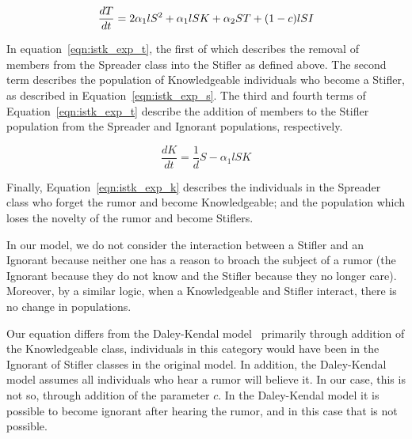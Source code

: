 \begin{equation}
\label{eqn:istk_exp_t} \frac{dT}{dt} =  2 \alpha_1l S^2 + \alpha_1l SK + \alpha_2 ST + (1-c)lSI \\
\end{equation}

In equation~\ref{eqn:istk_exp_t}, the first of which describes the removal of members from the Spreader class into the Stifler as defined above.
The second term describes the population of Knowledgeable individuals who become a Stifler, as described in Equation~\ref{eqn:istk_exp_s}.
The third and fourth terms of Equation~\ref{eqn:istk_exp_t} describe the addition of members to the Stifler population from the Spreader and Ignorant populations, respectively.

\begin{equation}
\label{eqn:istk_exp_k} \frac{dK}{dt} = \frac{1}{d}S - \alpha_1l SK
\end{equation}

Finally, Equation~\ref{eqn:istk_exp_k} describes the individuals in the Spreader class who forget the rumor and become Knowledgeable; and the population which loses the novelty of the rumor and become Stiflers.

In our model, we do not consider the interaction between a Stifler and an Ignorant because neither one has a reason to broach the subject of a rumor (the Ignorant because they do not know and the Stifler because they no longer care).
Moreover, by a similar logic, when a Knowledgeable and Stifler interact, there is no change in populations.


Our equation differs from the  Daley-Kendal model~\cite{daley-1965} primarily through addition of the Knowledgeable class, individuals in this category would have been in the Ignorant of Stifler classes in the original model.
In addition, the Daley-Kendal model assumes all individuals who hear a rumor will believe it.
In our case, this is not so, through addition of the parameter $ c $.
In the Daley-Kendal model it is possible to become ignorant after hearing the rumor, and in this case that is not possible.

